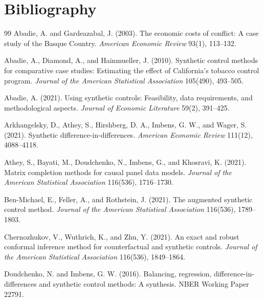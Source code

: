 \documentclass[11pt]{article}
\theoremstyle{definition}
\theoremstyle{plain}
\theoremstyle{remark}
\begin{document}
\section*{Bibliography}
\begin{thebibliography}{99}
Abadie, A. and Gardeazabal, J. (2003).
The economic costs of conflict: A case study of the Basque Country.
\emph{American Economic Review} 93(1), 113--132.

Abadie, A., Diamond, A., and Hainmueller, J. (2010).
Synthetic control methods for comparative case studies: Estimating the effect of California's tobacco control program.
\emph{Journal of the American Statistical Association} 105(490), 493--505.

Abadie, A. (2021).
Using synthetic controls: Feasibility, data requirements, and methodological aspects.
\emph{Journal of Economic Literature} 59(2), 391--425.

Arkhangelsky, D., Athey, S., Hirshberg, D. A., Imbens, G. W., and Wager, S. (2021).
Synthetic difference-in-differences.
\emph{American Economic Review} 111(12), 4088--4118.

Athey, S., Bayati, M., Doudchenko, N., Imbens, G., and Khosravi, K. (2021).
Matrix completion methods for causal panel data models.
\emph{Journal of the American Statistical Association} 116(536), 1716--1730.

Ben-Michael, E., Feller, A., and Rothstein, J. (2021).
The augmented synthetic control method.
\emph{Journal of the American Statistical Association} 116(536), 1789--1803.

Chernozhukov, V., Wuthrich, K., and Zhu, Y. (2021).
An exact and robust conformal inference method for counterfactual and synthetic controls.
\emph{Journal of the American Statistical Association} 116(536), 1849--1864.

Doudchenko, N. and Imbens, G. W. (2016).
Balancing, regression, difference-in-differences and synthetic control methods: A synthesis.
NBER Working Paper 22791.


\end{thebibliography}
\end{document}
